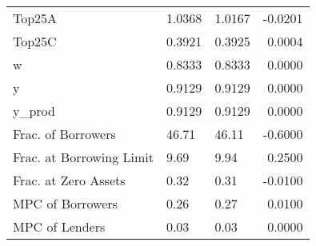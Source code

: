 \begin{table}
\begin{tabular}{lllr}
                  Top25A &  1.0368 &   1.0167 & -0.0201 \\
                  Top25C &  0.3921 &   0.3925 &  0.0004 \\
                       w &  0.8333 &   0.8333 &  0.0000 \\
                       y &  0.9129 &   0.9129 &  0.0000 \\
                  y\_prod &  0.9129 &   0.9129 &  0.0000 \\
      Frac. of Borrowers &   46.71 &    46.11 & -0.6000 \\
Frac. at Borrowing Limit &    9.69 &     9.94 &  0.2500 \\
    Frac. at Zero Assets &    0.32 &     0.31 & -0.0100 \\
        MPC of Borrowers &    0.26 &     0.27 &  0.0100 \\
          MPC of Lenders &    0.03 &     0.03 &  0.0000 \\
\bottomrule
\end{tabular}
\end{table}

